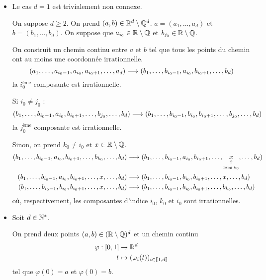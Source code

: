 \begin{itemize}
    \item Le cas $d=1$ est trivialement non connexe.
    
        \bigskip    
    
        On suppose $d\geqslant 2$. On prend $(a,b) \in \mathbb{R}^d\setminus \mathbb{Q}^d$. $a=(a_1,\ldots,a_d)$ et $b=(b_1,\ldots,b_d)$.
        On suppose que $a_{i_0} \in \mathbb{R}\setminus \mathbb{Q}$ et $b_{j_0} \in \mathbb{R}\setminus\mathbb{Q}$.
        
        On construit un chemin continu entre $a$ et $b$ tel que tous les points du chemin ont au moins une coordonnée irrationnelle.
        \[
            (a_1,\ldots,a_{i_0-1},a_{i_0},a_{i_0+1},\ldots,a_d) \longrightarrow (b_1,\ldots,b_{i_0-1},a_{i_0},b_{i_0+1},\ldots,b_d) 
        \]
        la $i_0^\text{ème}$ composante est irrationnelle.
        
        Si $i_0 \neq j_0$ : 
        \[
            (b_1,\ldots,b_{i_0-1},a_{i_0},b_{i_0+1},\ldots,b_{j_0},\ldots,b_d) \longrightarrow (b_1,\ldots,b_{i_0-1},b_{i_0},b_{i_0+1},\ldots, b_{j_0},\ldots,b_d)
        \]
        la $j_0^\text{ème}$ composante est irrationnelle.

        Sinon, on prend $k_0 \neq i_0$ et $x\in\mathbb{R}\setminus\mathbb{Q}$.
        \[
            \begin{aligned}
                (b_1,\ldots,b_{i_0-1},a_{i_0},b_{i_0+1},\ldots,b_{k_0},\ldots,b_d) &\longrightarrow (b_1,\ldots,b_{i_0-1},a_{i_0},b_{i_0+1},\ldots, \underset{\underset{\text{rang }k_0}{\uparrow}}{x},\ldots,b_d)\\
                (b_1,\ldots,b_{i_0-1},a_{i_0},b_{i_0+1},\ldots, x,\ldots,b_d) &\longrightarrow (b_1,\ldots,b_{i_0-1},b_{i_0},b_{i_0+1},\ldots, x,\ldots,b_d) \\
                (b_1,\ldots,b_{i_0-1},b_{i_0},b_{i_0+1},\ldots, x,\ldots,b_d) &\longrightarrow (b_1,\ldots,b_{i_0-1},b_{i_0},b_{i_0+1},\ldots, b_{k_0},\ldots,b_d)
            \end{aligned}
        \]
        où, respectivement, les composantes d'indice $i_0$, $k_0$ et $i_0$ sont irrationnelles.

    \item Soit $d\in\mathbb{N}^*$.
    
        On prend deux points $(a,b) \in (\mathbb{R}\setminus\mathbb{Q})^d$ et un chemin continu
        \[
            \begin{aligned}
                \varphi : [0,1] &\rightarrow \mathbb{R}^d\\
                t &\mapsto (\varphi_i(t))_{i\in\left\llbracket 1, d \right\rrbracket}
            \end{aligned}                    
        \]
        tel que $\varphi(0) = a$ et $\varphi(0) = b$.
        

\end{itemize}
